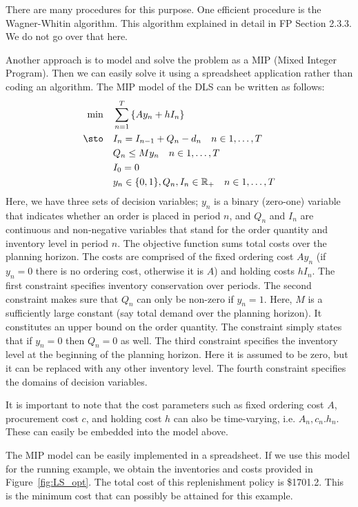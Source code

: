 \begin{solution}
There are many procedures for this purpose. One efficient procedure is the Wagner-Whitin algorithm. This algorithm explained in detail in FP Section 2.3.3. We do not go over that here.

Another approach is to model and solve the problem as a MIP (Mixed Integer Program). Then we can easily solve it using a spreadsheet application rather than coding an algorithm. The MIP model of the DLS can be written as follows:
\begin{align*}
\min\quad 
	& \sum_{n=1}^T \left\{Ay_n + hI_n\right\} \\
\sto\quad
	& I_n = I_{n-1} + Q_n - d_n \quad n\in 1,\ldots,T \\
	& Q_n \leq M y_n \quad n\in 1,\ldots,T \\
	& I_0 = 0 \\
	& y_n \in \{0,1\}, Q_n, I_n \in \mathbb{R}_+ \quad n\in 1,\ldots,T
\end{align*}
Here, we have three sets of decision variables; $y_n$ is a binary (zero-one) variable that indicates whether an order is placed in period $n$, and $Q_n$ and $I_n$ are continuous and non-negative variables that stand for the order quantity and inventory level in period $n$. The objective function sums total costs over the planning horizon. The costs are comprised of the fixed ordering cost $Ay_n$ (if $y_n=0$ there is no ordering cost, otherwise it is $A$) and holding costs $hI_n$. The first constraint specifies inventory conservation over periods. The second constraint makes sure that $Q_n$ can only be non-zero if $y_n=1$. Here, $M$ is a sufficiently large constant (say total demand over the planning horizon). It constitutes an upper bound on the order quantity. The constraint simply states that if $y_n=0$ then $Q_n=0$ as well. The third constraint specifies the inventory level at the beginning of the planning horizon. Here it is assumed to be zero, but it can be replaced with any other inventory level. The fourth constraint specifies the domains of decision variables.

It is important to note that the cost parameters such as fixed ordering cost $A$, procurement cost $c$, and holding cost $h$ can also be time-varying, i.e. $A_n,c_n.h_n$. These can easily be embedded into the model above.

The MIP model can be easily implemented in a spreadsheet. If we use this model for the running example, we obtain the inventories and costs provided in Figure~\ref{fig:LS_opt}. The total cost of this replenishment policy is \$1701.2. This is the minimum cost that can possibly be attained for this example.


\end{solution}
